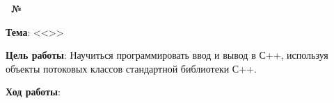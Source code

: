 \begin{center}
   \textbf{\titlePageWorkType~№\titlePageWorkNumber}
\end{center}

\textbf{Тема}: <<\titlePageTopic>>

\textbf{Цель работы}:
Научиться программировать ввод и вывод в С++, используя объекты потоковых классов стандартной библиотеки С++.

\begin{center}
   \textbf{Ход работы}:
\end{center}


